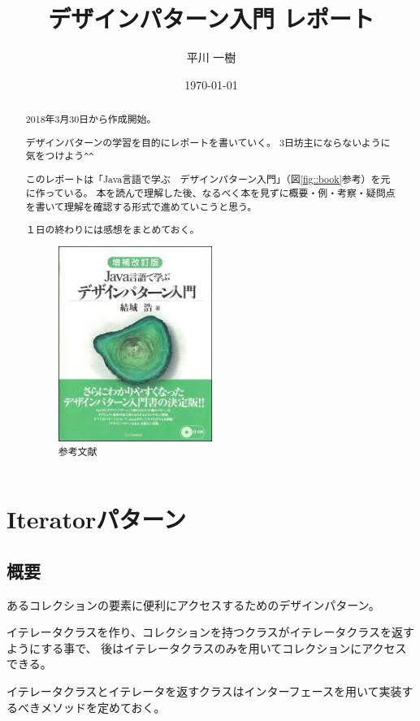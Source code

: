 \documentclass[11pt]{jsarticle}
\title{デザインパターン入門 レポート}
\author{平川 一樹}
\date{\today}
\begin{document}
	\maketitle
	
	\begin{abstract}
		2018年3月30日から作成開始。
		
		デザインパターンの学習を目的にレポートを書いていく。
		3日坊主にならないように気をつけよう\verb|^^|
		
		このレポートは「Java言語で学ぶ　デザインパターン入門」（図\ref{fig::book}参考）を元に作っている。
		本を読んで理解した後、なるべく本を見ずに概要・例・考察・疑問点を書いて理解を確認する形式で進めていこうと思う。
		
		１日の終わりには感想をまとめておく。
		\begin{figure}[htbp]
			\centering
			\includegraphics[width = 5cm, bb = 0 0 199 253]{book.jpg}
			\caption{参考文献}\label{fig::book}
		\end{figure}
	\end{abstract}
	
	\clearpage
	\tableofcontents
	\clearpage
	
	\section{Iteratorパターン}
	\subsection{概要}
		あるコレクションの要素に便利にアクセスするためのデザインパターン。
		
		イテレータクラスを作り、コレクションを持つクラスがイテレータクラスを返すようにする事で、
		後はイテレータクラスのみを用いてコレクションにアクセスできる。
		
		イテレータクラスとイテレータを返すクラスはインターフェースを用いて実装するべきメソッドを定めておく。
\end{document}
